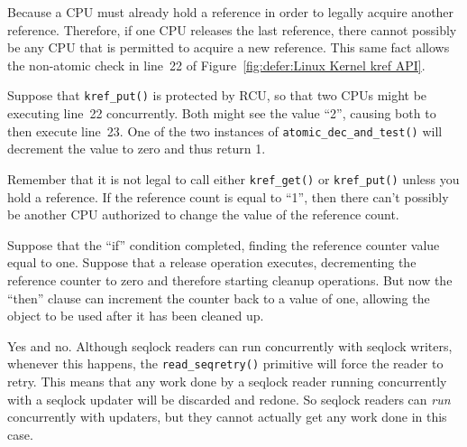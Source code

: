 	  Because a CPU must already hold a reference in order
	  to legally acquire another reference.
	  Therefore, if one CPU releases the last reference,
	  there cannot possibly be any CPU that is permitted
	  to acquire a new reference.
	  This same fact allows the non-atomic check in line~22
	  of Figure~\ref{fig:defer:Linux Kernel kref API}.


	  Suppose that {\tt kref\_put()} is protected by RCU, so
	  that two CPUs might be executing line~22 concurrently.
	  Both might see the value ``2'', causing both to then
	  execute line~23.
	  One of the two instances of {\tt atomic\_dec\_and\_test()}
	  will decrement the value to zero and thus return 1.


	  Remember that it is not legal to call either {\tt kref\_get()}
	  or {\tt kref\_put()} unless you hold a reference.
	  If the reference count is equal to ``1'', then there
	  can't possibly be another CPU authorized to change the
	  value of the reference count.


	  Suppose that the ``if'' condition completed, finding
	  the reference counter value equal to one.
	  Suppose that a release operation executes, decrementing
	  the reference counter to zero and therefore starting
	  cleanup operations.
	  But now the ``then'' clause can increment the counter
	  back to a value of one, allowing the object to be
	  used after it has been cleaned up.


Yes and no.
Although seqlock readers can run concurrently with
seqlock writers, whenever this happens, the {\tt read\_seqretry()}
primitive will force the reader to retry.
This means that any work done by a seqlock reader running concurrently
with a seqlock updater will be discarded and redone.
So seqlock readers can \emph{run} concurrently with updaters,
but they cannot actually get any work done in this case.

